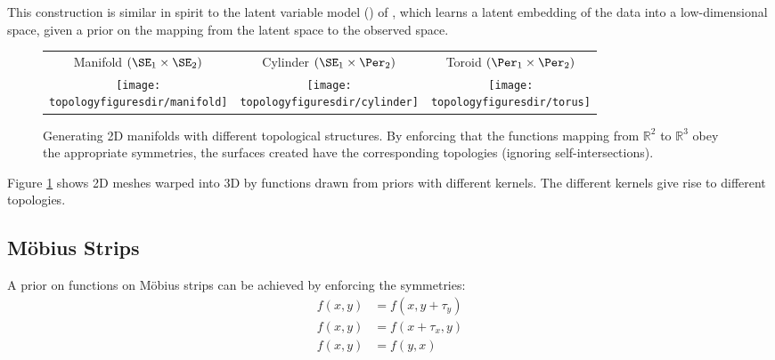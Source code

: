 This construction is similar in spirit to the \gp{} latent variable model (\gplvm{}) of \citet{lawrence2005probabilistic}, which learns a latent embedding of the data into a low-dimensional space, given a \gp{} prior on the mapping from the latent space to the observed space.%


\begin{figure}
\renewcommand{\tabcolsep}{1mm}
\begin{tabular}{ccc}
Manifold $( \SE_1 \times \SE_2 )$  & Cylinder $( \SE_1 \times \Per_2 )$ & Toroid $( \Per_1 \times \Per_2 )$\\
\hspace{-0.5cm}\texttt{[image: \\topologyfiguresdir/manifold]} &
\texttt{[image: \\topologyfiguresdir/cylinder]} &
\texttt{[image: \\topologyfiguresdir/torus]} \\
\end{tabular}
\caption[Generating 2D manifolds with different topological structures]{
Generating 2D manifolds with different topological structures.
By enforcing that the functions mapping from $\mathbb{R}^2$ to $\mathbb{R}^3$ obey the appropriate symmetries, the surfaces created have the corresponding topologies (ignoring self-intersections).
}
\label{fig:gen_surf}
\end{figure}

Figure \ref{fig:gen_surf} shows 2D meshes warped into 3D by functions drawn from \gp{} priors with different kernels.
The different kernels give rise to different topologies.


\subsection{M\"{o}bius Strips}

A prior on functions on M\"{o}bius strips can be achieved by enforcing the symmetries:
%
\begin{align}
f(x, y) & = f( x, y + \tau_y) \\
f(x, y) & = f( x + \tau_x, y)  \\
f(x, y) & = f( y, x )
\end{align}

